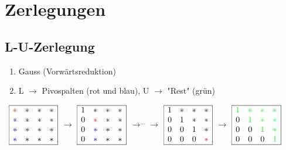 
\section{Zerlegungen}

\subsection{L-U-Zerlegung}
	\begin{enumerate}
		\item Gauss (Vorwärtsreduktion)
		\item L $\rightarrow$ Pivospalten (rot und blau), U $\rightarrow$ "Rest" (grün) 
	\end{enumerate}\ 
	$\begin{array}{|cccc|}
		\hline 
		\color{red}* & * & * & *\\
		\color{blue}* & * & * & *\\
		\color{blue}* & * & * & *\\
		\color{blue}* & * & * & *\\
		\hline
	\end{array}$
	$\rightarrow$
	$\begin{array}{|cccc|}
		\hline 
		1 & * & * & *\\
		0 & \color{red}* & * & *\\
		0 & \color{blue}* & * & *\\
		0 & \color{blue}* & * & *\\
		\hline
	\end{array}$
	$\rightarrow^{...}\rightarrow$
	$\begin{array}{|cccc|}
		\hline 
		1 & * & * & *\\
		0 & 1 & * & *\\
		0 & 0 & 1 & *\\
		0 & 0 & 0 & \color{red}*\\
		\hline
	\end{array}$
	$\rightarrow$
	$\begin{array}{|cccc|}
		\hline 
		\color{green}1 & \color{green}* & \color{green}* & \color{green}*\\
		0 & \color{green}1 & \color{green}* & \color{green}*\\
		0 & 0 & \color{green}1 & \color{green}*\\
		0 & 0 & 0 & \color{green}1\\
		\hline
	\end{array}$\ \ \ \

